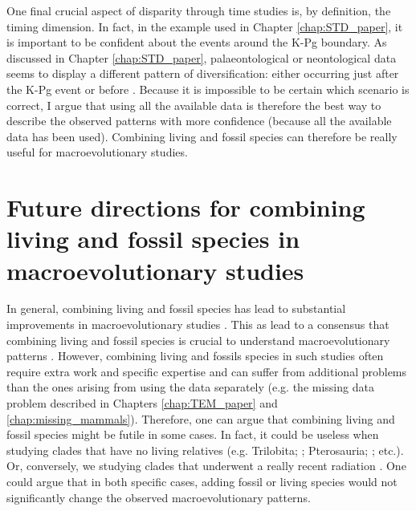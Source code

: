 One final crucial aspect of disparity through time studies is, by definition, the timing dimension.
In fact, in the example used in Chapter \ref{chap:STD_paper}, it is important to be confident about the events around the K-Pg boundary.
As discussed in Chapter \ref{chap:STD_paper}, palaeontological or neontological data seems to display a different pattern of diversification: either occurring just after the K-Pg event \citep[suggesting an effect of K-Pg;][]{O'Leary08022013} or before \citep[rejecting an effect of K-Pg;][]{meredithimpacts2011,dosReis2014}.
Because it is impossible to be certain which scenario is correct, I argue that using all the available data \citep[both living and fossil;][]{Slater2012MEE,beckancient2014} is therefore the best way to describe the observed patterns with more confidence (because all the available data has been used).
Combining living and fossil species can therefore be really useful for macroevolutionary studies.

\section{Future directions for combining living and fossil species in macroevolutionary studies}
In general, combining living and fossil species has lead to substantial improvements in macroevolutionary studies \citep{Finarelli2006,Slateretal2012,Slater2012MEE,SlaterPennel2014,pant2014complex,Mitchell2015}.
This as lead to a consensus that combining living and fossil species is crucial to understand macroevolutionary patterns \citep{jacksonwhat2006,quentaldiversity2010,dietlconservation2011,slaterunifying2013,fritzdiversity2013,benton2015}.
However, combining living and fossils species in such studies often require extra work and specific expertise \citep[e.g.][]{ronquista2012} and can suffer from additional problems than the ones arising from using the data separately (e.g. the missing data problem described in Chapters \ref{chap:TEM_paper} and \ref{chap:missing_mammals}).
Therefore, one can argue that combining living and fossil species might be futile in some cases.
In fact, it could be useless when studying clades that have no living relatives (e.g. Trilobita; \citealt{hopkinsdecoupling2013}; Pterosauria; \citealt{Butler2012}; etc.).
Or, conversely, we studying clades that underwent a really recent radiation \citep[e.g. Cichlidae;][]{Genner01052007}.
One could argue that in both specific cases, adding fossil or living species would not significantly change the observed macroevolutionary patterns.

